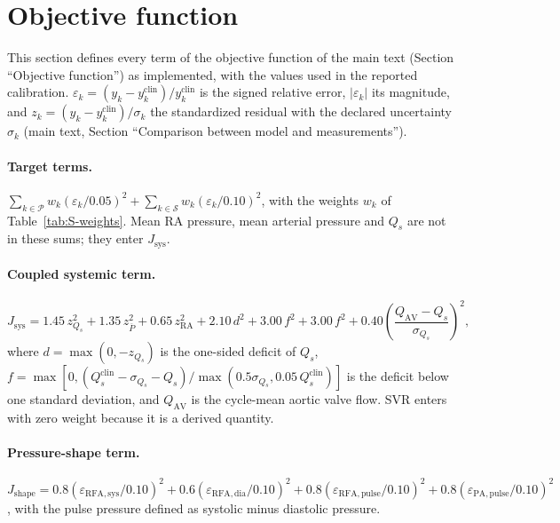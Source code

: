\documentclass{article}
\begin{document}
\section{Objective function}
\label{sec:S-weights}
This section defines every term of the objective function of the main text (Section ``Objective function'') as implemented, with the values used in the reported calibration. $\varepsilon_k = (y_k - y_k^{\mathrm{clin}})/y_k^{\mathrm{clin}}$ is the signed relative error, $\lvert\varepsilon_k\rvert$ its magnitude, and $z_k = (y_k - y_k^{\mathrm{clin}})/\sigma_k$ the standardized residual with the declared uncertainty $\sigma_k$ (main text, Section ``Comparison between model and measurements'').

\paragraph{Target terms.} $\sum_{k\in\mathcal{P}} w_k(\varepsilon_k/0.05)^2 + \sum_{k\in\mathcal{S}} w_k(\varepsilon_k/0.10)^2$, with the weights $w_k$ of Table~\ref{tab:S-weights}. Mean RA pressure, mean arterial pressure and $Q_s$ are not in these sums; they enter $J_{\mathrm{sys}}$.

\paragraph{Coupled systemic term.}
\begin{equation*}
J_{\mathrm{sys}} = 1.45\,z_{Q_s}^2 + 1.35\,z_{\overline{P}}^2 + 0.65\,z_{\mathrm{RA}}^2
+ 2.10\,d^2 + 3.00\,f^2 + 3.00\,f^2 + 0.40\left(\frac{Q_{\mathrm{AV}} - Q_s}{\sigma_{Q_s}}\right)^2,
\end{equation*}
where $d = \max(0, -z_{Q_s})$ is the one-sided deficit of $Q_s$, $f = \max[0, (Q_s^{\mathrm{clin}} - \sigma_{Q_s} - Q_s)/\max(0.5\sigma_{Q_s}, 0.05\,Q_s^{\mathrm{clin}})]$ is the deficit below one standard deviation, and $Q_{\mathrm{AV}}$ is the cycle-mean aortic valve flow. SVR enters with zero weight because it is a derived quantity.

\paragraph{Pressure-shape term.} $J_{\mathrm{shape}} = 0.8(\varepsilon_{\mathrm{RFA,sys}}/0.10)^2 + 0.6(\varepsilon_{\mathrm{RFA,dia}}/0.10)^2 + 0.8(\varepsilon_{\mathrm{RFA,pulse}}/0.10)^2 + 0.8(\varepsilon_{\mathrm{PA,pulse}}/0.10)^2$, with the pulse pressure defined as systolic minus diastolic pressure.
\end{document}
